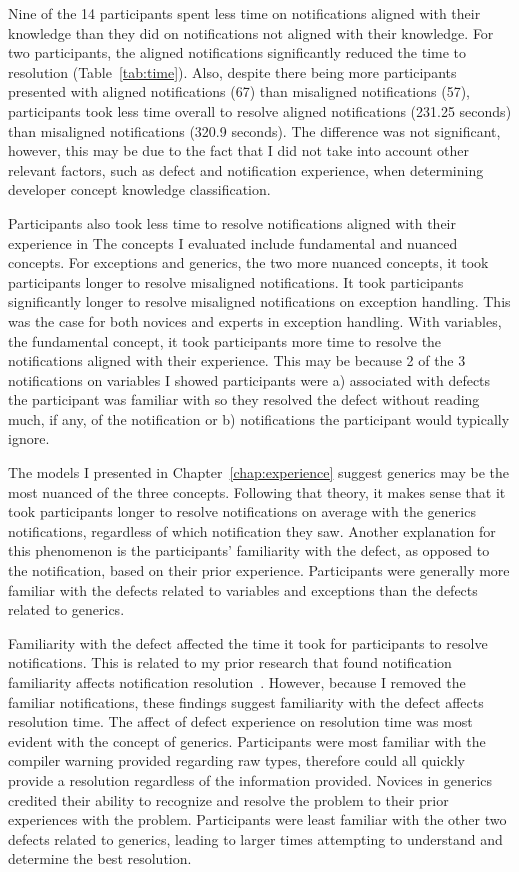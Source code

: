 Nine of the 14 participants spent less time on notifications aligned with their knowledge than they did on notifications not aligned with their knowledge.
For two participants, the aligned notifications significantly reduced the time to resolution (Table~\ref{tab:time}).
Also, despite there being more participants presented with aligned notifications (67) than misaligned notifications (57), participants took less time overall to resolve aligned notifications (231.25 seconds) than misaligned notifications (320.9 seconds). The difference was not significant, however, this may be due to the fact that I did not take into account other relevant factors, such as defect and notification experience, when determining developer concept knowledge classification.

Participants also took less time to resolve notifications aligned with their experience in
The concepts I evaluated include fundamental and nuanced concepts.
For exceptions and generics, the two more nuanced concepts, it took participants longer to resolve misaligned notifications.
It took participants significantly longer to resolve misaligned notifications on exception handling. 
This was the case for both novices and experts in exception handling.
With variables, the fundamental concept, it took participants more time to resolve the notifications aligned with their experience. 
This may be because 2 of the 3 notifications on variables I showed participants were a) associated with defects the participant was familiar with so they resolved the defect without reading much, if any, of the notification or b) notifications the participant would typically ignore.

The models I presented in Chapter~\ref{chap:experience} suggest generics may be the most nuanced of the three concepts. Following that theory, it makes sense that it took participants longer to resolve notifications on average with the generics notifications, regardless of which notification they saw.
Another explanation for this phenomenon is the participants' familiarity with the defect, as opposed to the notification, based on their prior experience.
Participants were generally more familiar with the defects related to variables and exceptions than the defects related to generics.

Familiarity with the defect affected the time it took for participants to resolve notifications.
This is related to my prior research that found notification familiarity affects notification resolution~\cite{johnson2016cross}. However, because I removed the familiar notifications, these findings suggest familiarity with the defect affects resolution time.
The affect of defect experience on resolution time was most evident with the concept of generics. Participants were most familiar with the compiler warning provided regarding raw types, therefore could all quickly provide a resolution regardless of the information provided.
Novices in generics credited their ability to recognize and resolve the problem to their prior experiences with the problem.
Participants were least familiar with the other two defects related to generics, leading to larger times attempting to understand and determine the best resolution. 


